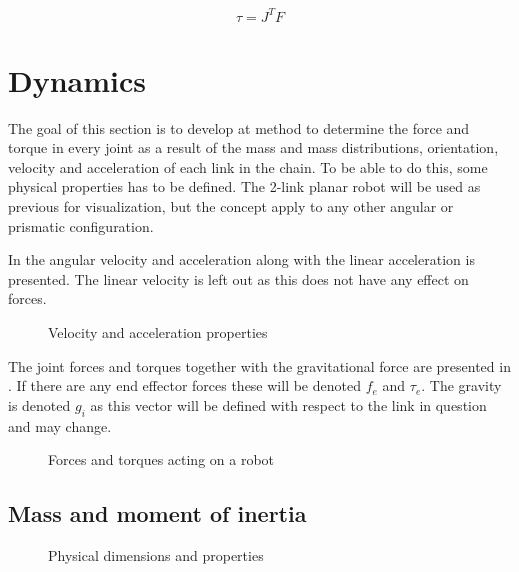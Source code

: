\begin{equation}\label{Jtorque}
\tau = J^T F
\end{equation}

\section{Dynamics}

The goal of this section is to develop at method to determine the force and torque in every joint as a result of the mass and mass distributions, orientation, velocity and acceleration of each link in the chain. To be able to do this, some physical properties has to be defined. The 2-link planar robot will be used as previous for visualization, but the concept apply to any other angular or prismatic configuration.

In  the angular velocity and acceleration along with the linear acceleration is presented. The linear velocity is left out as this does not have any effect on forces.

\begin{figure}[h!]    
    \centering           
    \def\svgwidth{\columnwidth}
    
    \caption{Velocity and acceleration properties}
    \label{speed}
\end{figure}

The joint forces and torques together with the gravitational force are presented in . If there are any end effector forces these will be denoted $f_e$ and $\tau_e$. The gravity is denoted $g_i$ as this vector will be defined with respect to the link in question and may change.

\begin{figure}[h!]    
    \centering           
    \def\svgwidth{\columnwidth}
    
    \caption{Forces and torques acting on a robot}
    \label{forces}
\end{figure}

\subsection{Mass and moment of inertia}

\begin{figure}[h!]    
    \centering           
    \def\svgwidth{\columnwidth}
    
    \caption{Physical dimensions and properties}
    \label{physical}
\end{figure}

